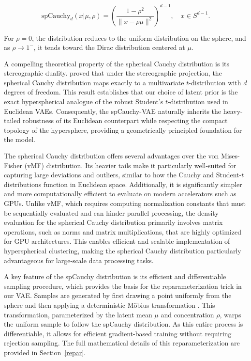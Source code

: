 \documentclass{article}
\begin{document}
\[
\mathrm{spCauchy}_d(x | \mu, \rho) = \left(\frac{1 - \rho^2}{\| x - \rho \mu \|^{2}}\right)^{d-1}, \quad x \in S^{d-1}.
\]

For \( \rho = 0 \), the distribution reduces to the uniform distribution on the sphere, and as \( \rho \to 1^- \), it tends toward the Dirac distribution centered at \( \mu \).

A compelling theoretical property of the spherical Cauchy distribution is its stereographic duality. \cite{spCauchy} proved that under the stereographic projection, the spherical Cauchy distribution maps exactly to a multivariate $t$-distribution with $d$ degrees of freedom. This result establishes that our choice of latent prior is the exact hyperspherical analogue of the robust Student's $t$-distribution used in Euclidean VAEs. Consequently, the spCauchy-VAE naturally inherits the heavy-tailed robustness of its Euclidean counterpart while respecting the compact topology of the hypersphere, providing a geometrically principled foundation for the model.

The spherical Cauchy distribution offers several advantages over the von Mises-Fisher (vMF) distribution. Its heavier tails make it particularly well-suited for capturing large deviations and outliers, similar to how the Cauchy and Student-\(t\) distributions function in Euclidean space. Additionally, it is significantly simpler and more computationally efficient to evaluate on modern accelerators such as GPUs. Unlike vMF, which requires computing normalization constants that must be sequentially evaluated and can hinder parallel processing, the density evaluation for the spherical Cauchy distribution primarily involves matrix operations, such as norms and matrix multiplications, that are highly optimized for GPU architectures. This enables efficient and scalable implementation of hyperspherical clustering, making the spherical Cauchy distribution particularly advantageous for large-scale data processing tasks.

A key feature of the spCauchy distribution is its efficient and differentiable sampling procedure, which provides the basis for the reparameterization trick in our VAE. Samples are generated by first drawing a point uniformly from the sphere and then applying a deterministic Möbius transformation \citep{spCauchy}. This transformation, parameterized by the latent mean \(\mu\) and concentration \(\rho\), warps the uniform sample to follow the spCauchy distribution. As this entire process is differentiable, it allows for efficient gradient-based training without requiring rejection sampling. The full mathematical details of this reparameterization are provided in Section~\ref{repar}.
\end{document}
